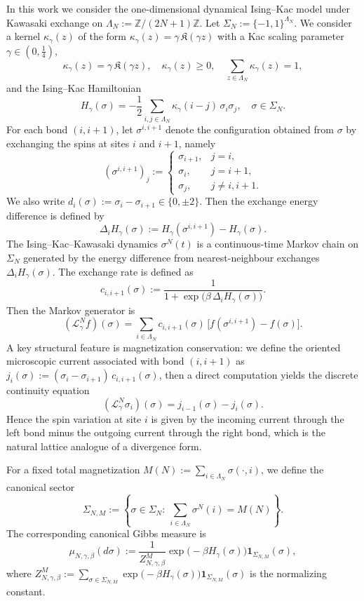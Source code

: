 \documentclass{article}
\begin{document}
In this work we consider the one-dimensional dynamical Ising--Kac model under Kawasaki exchange \cite{Kawasaki1966I} on $\Lambda_N := \mathbb{Z}/(2N+1)\mathbb{Z}$.
Let \(\Sigma_N := \{-1,1\}^{\Lambda_N}.\)
We consider a kernel $\kappa_\gamma(z)$ of the form $\kappa_\gamma(z) = \gamma\,\mathfrak K(\gamma z)$ with a Kac scaling parameter $\gamma\in(0,\frac{1}{4})$, 
\[
\kappa_\gamma(z) = \gamma\,\mathfrak K(\gamma z), \quad \kappa_\gamma(z)\ge 0,
\quad 
\sum_{z\in\Lambda_N}\kappa_\gamma(z)=1,
\]
and the Ising--Kac Hamiltonian
\[
H_\gamma(\sigma)
=
-\frac12 \sum_{i,j\in\Lambda_N} \kappa_\gamma(i-j)\,\sigma_i\sigma_j,
\quad \sigma\in\Sigma_N.
\]
For each bond $(i,i+1)$, let $\sigma^{i,i+1}$ denote the configuration obtained from
$\sigma$ by exchanging the spins at sites $i$ and $i+1$, namely
\[
(\sigma^{i,i+1})_j
:=
\begin{cases}
\sigma_{i+1}, & j=i,\\
\sigma_i, & j=i+1,\\
\sigma_j, & j\neq i,i+1.
\end{cases}
\]
We also write
\(
d_i(\sigma):=\sigma_i-\sigma_{i+1}\in\{0,\pm 2\}.
\)
Then the exchange energy difference is defined by
\[
\Delta_i H_\gamma(\sigma)
:=
H_\gamma(\sigma^{i,i+1})-H_\gamma(\sigma).
\]
The Ising--Kac--Kawasaki dynamics $\sigma^N(t)$ is a continuous-time Markov chain on $\Sigma_N$ generated by the energy difference from nearest-neighbour exchanges $\Delta_i H_\gamma(\sigma)$.
The exchange rate is defined as
\[
c_{i,i+1}(\sigma) := \frac{1}{1+\exp\!\bigl(\beta\,\Delta_i H_\gamma(\sigma)\bigr)}.
\]
Then the Markov generator is
\[
(\mathscr L_\gamma^{N} f)(\sigma)
=
\sum_{i \in\Lambda_N} c_{i,i+1}(\sigma)\,\bigl[f(\sigma^{i,i+1})-f(\sigma)\bigr].
\]
A key structural feature is magnetization conservation: we define the oriented microscopic current associated with bond $(i,i+1)$ as
\(
j_i(\sigma):=(\sigma_i-\sigma_{i+1})\,c_{i,i+1}(\sigma)\),
then a direct computation yields the discrete continuity equation
\[
(\mathscr L_\gamma^{N}\sigma_i)(\sigma)=j_{i-1}(\sigma)-j_i(\sigma).
\]
Hence the spin variation at site \(i\) is given by the incoming current through the left bond minus the outgoing current through the right bond, which is the natural lattice analogue of a divergence form.

For a fixed total magnetization $M(N):=\sum_{i \in \Lambda_N} \sigma(\cdot,i)$, we define the canonical sector
\[
\Sigma_{N,M}
:=
\left\{
\sigma\in\Sigma_N:\ \sum_{i\in\Lambda_N}\sigma^N(i)=M(N)
\right\}.
\]
The corresponding canonical Gibbs measure is
\[
\mu_{N,\gamma,\beta}(d\sigma)
:=
\frac{1}{Z_{N,\gamma,\beta}^{M}}
\exp\!\bigl(-\beta H_\gamma(\sigma)\bigr)
\mathbf 1_{\Sigma_{N,M}}(\sigma),
\]
where $Z_{N,\gamma,\beta}^{M}
:=
\sum_{\sigma\in\Sigma_{N,M}}\exp\!\bigl(-\beta H_\gamma(\sigma)\bigr)
\mathbf 1_{\Sigma_{N,M}}(\sigma)$ is the normalizing constant.
\end{document}
